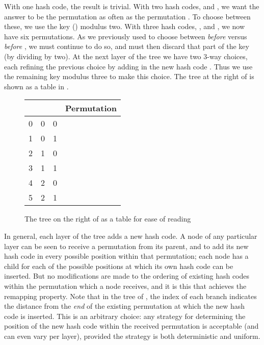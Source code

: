 \documentclass[runningheads,a4paper]{llncs}
\begin{document}
With one hash code, the result is trivial. With two hash codes,
 and , we want the answer to be the permutation
 as often as the permutation . To
choose between these, we use the key () modulus two. With
three hash codes, ,  and , we now have six
permutations. As we previously used  to choose between
{\em  before } versus {\em  before }, we
must continue to do so, and must then discard that part of the key (by
dividing by two). At the next layer of the tree we have two 3-way
choices, each refining the previous choice by adding in the new hash
code . Thus we use the remaining key modulus three to make
this choice. The tree at the right of  is shown
as a table in .

\begin{figure}
\begin{center}
\begin{tabular}{|c|c|c|c|}
\hline  &  &  & Permutation \\
\hline 0 & 0 & 0 &  \\
\hline 1 & 0 & 1 &  \\
\hline 2 & 1 & 0 &  \\
\hline 3 & 1 & 1 &  \\
\hline 4 & 2 & 0 &  \\
\hline 5 & 2 & 1 &  \\\hline
\end{tabular}
\end{center}
\caption{The tree on the right of  as a table for ease of reading}
\label{fig:tree-3-table}
\end{figure}

In general, each layer of the tree adds a new hash code. A node of any
particular layer can be seen to receive a permutation from its parent,
and to add its new hash code in every possible position within that
permutation; each node has a child for each of the possible positions
at which its own hash code can be inserted. But no modifications are
made to the ordering of existing hash codes within the permutation
which a node receives, and it is this that achieves the remapping
property. Note that in the tree of , the index of
each branch indicates the distance from the {\em end} of the existing
permutation at which the new hash code is inserted. This is an
arbitrary choice: any strategy for determining the position of the new
hash code within the received permutation is acceptable (and can even
vary per layer), provided the strategy is both deterministic and
uniform.
\end{document}
